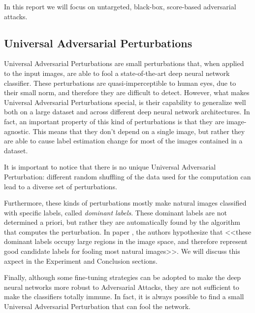 

In this report we will focus on untargeted, black-box, score-based adversarial attacks.

\subsection{Universal Adversarial Perturbations}
\label{section:perturb}
Universal Adversarial Perturbations are small perturbations that, when applied to the input images, are able
to fool a state-of-the-art deep neural network classifier. These perturbations are quasi-imperceptible to human eyes,
due to their small norm, and therefore they are difficult to detect. However, what makes Universal Adversarial Perturbations special,
is their capability to generalize well both on a large dataset and across different deep neural network architectures.
In fact, an important property of this kind of perturbations is that they are image-agnostic. This means that
they don't depend on a single image, but rather they are able to cause label estimation change for most of
the images contained in a dataset.

It is important to notice that there is no unique Universal Adversarial Perturbation: different random shuffling of the data used
for the computation can lead to a diverse set of perturbations.

Furthermore, these kinds of perturbations mostly make natural images classified with specific labels, called
\textit{dominant labels}. These dominant labels are not determined a priori, but rather they are automatically
found by the algorithm that computes the perturbation. In paper \cite{A2}, the authors
hypothesize that <<these dominant labels occupy large regions in the image space, and therefore represent good
candidate labels for fooling most natural images>>. We will discuss this axpect in the Experiment and Conclusion sections.

Finally, although some fine-tuning strategies can be adopted to make the deep neural networks more robust to Adversarial
Attacks, they are not sufficient to make the classifiers totally immune. In fact, it is always
possible to find a small Universal Adversarial Perturbation that can fool the network.




